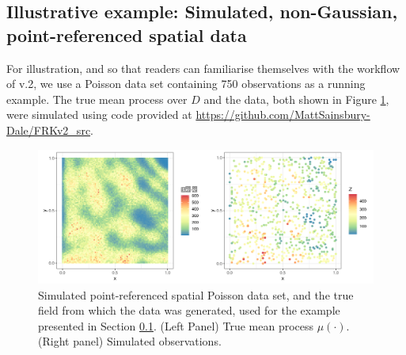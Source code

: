 \documentclass[nojss]{jss}
\newcommand{\class}[1]{`\code{#1}'}
\begin{document}
\subsection{Illustrative example: Simulated, non-Gaussian, point-referenced spatial data}\label{sec:03-01:Poisson}






For illustration, and so that readers can familiarise themselves with the workflow of  v.2, we use a Poisson data set containing 750 observations as a running example. 
The true mean process over $D$ and the data, both shown in Figure \ref{fig:Poisson_true_and_Z}, were simulated using code provided at \url{https://github.com/MattSainsbury-Dale/FRKv2_src}.

\begin{figure}[t!]
    \centering
    \includegraphics[width = 0.75\linewidth]{img/Poisson_sim_true_process_and_data.png}
    \caption{Simulated point-referenced spatial Poisson data set, and the true field from which the data was generated, used for the example presented in Section \ref{sec:03-01:Poisson}. (Left Panel) True mean process $\mu(\cdot)$. (Right panel) Simulated observations.  
}   
  \label{fig:Poisson_true_and_Z}
\end{figure}
\end{document}

